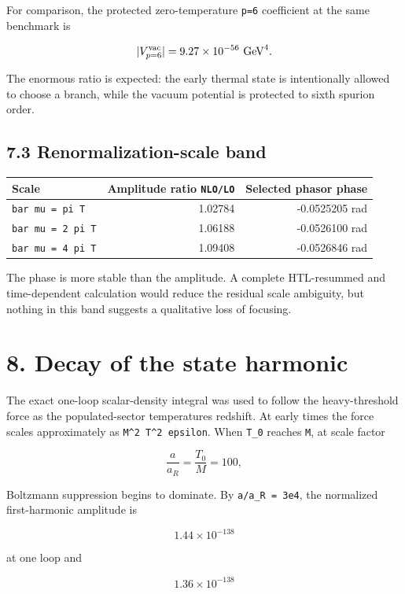 \documentclass[
  10pt,
  a4paper,
]{article}
\begin{document}
For comparison, the protected zero-temperature \texttt{p=6} coefficient
at the same benchmark is

\[
|V_{p=6}^{\rm vac}|=9.27\times10^{-56}\ {\rm GeV}^4.
\]

The enormous ratio is expected: the early thermal state is intentionally
allowed to choose a branch, while the vacuum potential is protected to
sixth spurion order.

\subsection{7.3 Renormalization-scale
band}\label{renormalization-scale-band}

\begin{longtable}[]{@{}lrr@{}}
\toprule\noalign{}
Scale & Amplitude ratio \texttt{NLO/LO} & Selected phasor phase \\
\midrule\noalign{}
\endhead
\bottomrule\noalign{}
\endlastfoot
\texttt{bar\ mu\ =\ pi\ T} & 1.02784 & -0.0525205 rad \\
\texttt{bar\ mu\ =\ 2\ pi\ T} & 1.06188 & -0.0526100 rad \\
\texttt{bar\ mu\ =\ 4\ pi\ T} & 1.09408 & -0.0526846 rad \\
\end{longtable}

The phase is more stable than the amplitude. A complete HTL-resummed and
time-dependent calculation would reduce the residual scale ambiguity,
but nothing in this band suggests a qualitative loss of focusing.

\section{8. Decay of the state
harmonic}\label{decay-of-the-state-harmonic}

The exact one-loop scalar-density integral was used to follow the
heavy-threshold force as the populated-sector temperatures redshift. At
early times the force scales approximately as
\texttt{M\^{}2\ T\^{}2\ epsilon}. When \texttt{T\_0} reaches \texttt{M},
at scale factor

\[
\frac{a}{a_R}=\frac{T_0}{M}=100,
\]

Boltzmann suppression begins to dominate. By \texttt{a/a\_R\ =\ 3e4},
the normalized first-harmonic amplitude is

\[
1.44\times10^{-138}
\]

at one loop and

\[
1.36\times10^{-138}
\]
\end{document}
